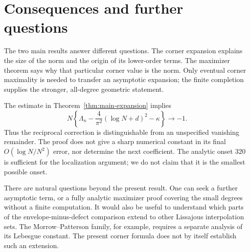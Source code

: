 \section{Consequences and further questions}\label{sec:discussion}
The two main results answer different questions. The corner expansion
explains the size of the norm and the origin of its lower-order terms.
The maximizer theorem says why that particular corner value is the norm.
Only eventual corner maximality is needed to transfer an asymptotic
expansion; the finite completion supplies the stronger, all-degree
geometric statement.

The estimate in Theorem~\ref{thm:main-expansion} implies
\[
 N\left\{\Lambda_n-\frac4{\pi^2}(\log N+d)^2-\kappa\right\}
 \longrightarrow -1.
\]
Thus the reciprocal correction is distinguishable from an unspecified
vanishing remainder. The proof does not give a sharp numerical constant
in its final $O(\log N/N^2)$ error, nor determine the next coefficient.
The analytic onset $320$ is sufficient for the localization argument;
we do not claim that it is the smallest possible onset.

There are natural questions beyond the present result. One can seek a
further asymptotic term, or a fully analytic maximizer proof covering the
small degrees without a finite computation. It would also be useful to
understand which parts of the envelope-minus-defect comparison extend
to other Lissajous interpolation sets. The Morrow--Patterson family,
for example, requires a separate analysis of its Lebesgue constant. The present corner formula does not by itself establish such
an extension.
